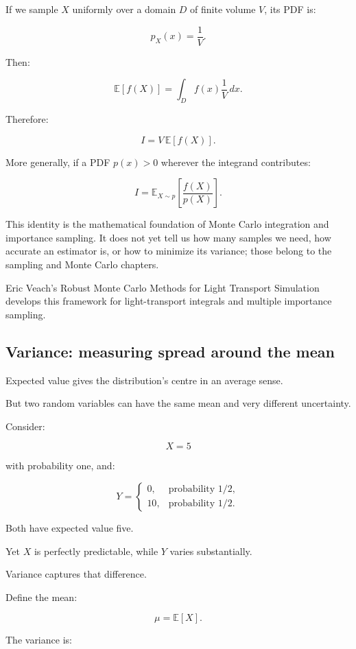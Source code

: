 If we sample \(X\) uniformly over a domain \(D\) of finite volume \(V\), its PDF is:

\[
 p_X(x)=\frac1V.
\]

Then:

\[
 \mathbb E[f(X)] = \int_Df(x)\frac1V\,dx.
\]

Therefore:

\[
 \boxed{ I=V\,\mathbb E[f(X)] }.
\]

More generally, if a PDF \(p(x)>0\) wherever the integrand contributes:

\[
 \boxed{ I= \mathbb E_{X\sim p} \left[ \frac{f(X)}{p(X)} \right] }.
\]

This identity is the mathematical foundation of Monte Carlo integration and importance sampling. It does not yet tell us how many samples we need, how accurate an estimator is, or how to minimize its variance; those belong to the sampling and Monte Carlo chapters.

Eric Veach's Robust Monte Carlo Methods for Light Transport Simulation develops this framework for light-transport integrals and multiple importance sampling.

\subsection{Variance: measuring spread around the mean}\label{02-foundations-ii-ch023-variance-measuring-spread-around-the-mean}

Expected value gives the distribution's centre in an average sense.

But two random variables can have the same mean and very different uncertainty.

Consider:

\[
 X=5
\]

with probability one, and:

\[
 Y= \begin{cases} 0,&\text{probability }1/2,\\ 10,&\text{probability }1/2. \end{cases}
\]

Both have expected value five.

Yet \(X\) is perfectly predictable, while \(Y\) varies substantially.

Variance captures that difference.

Define the mean:

\[
 \mu=\mathbb E[X].
\]

The variance is:

